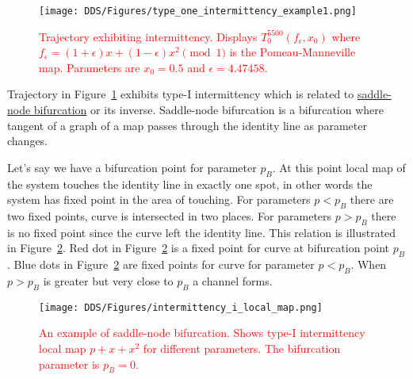 \begin{figure}[!h]
    \centering
    \texttt{[image: DDS/Figures/type\_one\_intermittency\_example1.png]}
    \caption{
        \textcolor{red}{
        Trajectory exhibiting intermittency. 
        Displays $T^{5500}_{0}(f_{\epsilon}, x_0)$ where $f_{\epsilon} = (1+\epsilon)x+(1-\epsilon)x^2 \pmod{1}$ is the Pomeau-Manneville map. 
        Parameters are $x_0 = 0.5$ and $\epsilon = 4.47458$.
        }
    }
    \label{fig:intermittent_trajectory_example}
\end{figure}

Trajectory in Figure~\ref{fig:intermittent_trajectory_example} exhibits type-I intermittency which is related to \hyperref[def:saddle_node_bif]{saddle-node bifurcation} or its inverse.
Saddle-node bifurcation is a bifurcation where tangent of a graph of a map passes through the identity line as parameter changes.
\par
Let's say we have a bifurcation point for parameter $p_{B}$.
At this point local map of the system touches the identity line in exactly one spot, in other words the system has fixed point in the area of touching.
For parameters $p < p_{B}$ there are two fixed points, curve is intersected in two places.
For parameters $p > p_{B}$ there is no fixed point since the curve left the identity line.
This relation is illustrated in Figure~\ref{fig:saddle_node_bifurcation}.
Red dot in Figure~\ref{fig:saddle_node_bifurcation} is a fixed point for curve at bifurcation point $p_{B}$.
Blue dots in Figure~\ref{fig:saddle_node_bifurcation} are fixed points for curve for parameter $p < p_{B}$.
When $p > p_{B}$ is greater but very close to $p_{B}$ a channel forms.
\begin{figure}[!h]
    \centering
    \texttt{[image: DDS/Figures/intermittency\_i\_local\_map.png]}
    \caption{
        \textcolor{red}{
        An example of saddle-node bifurcation. 
        Shows type-I intermittency local map $p + x + x^2$ for different parameters. 
        The bifurcation parameter is $p_B = 0$.
        }
    }
    \label{fig:saddle_node_bifurcation}
\end{figure}


